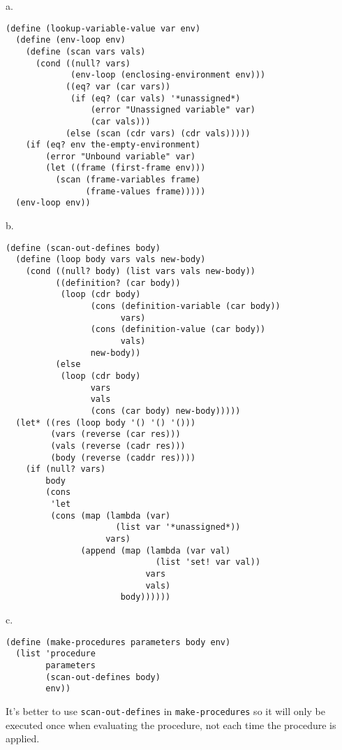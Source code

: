 \documentclass[a4paper,12pt]{article}
\newcommand{\subpar}[1]{\medskip \noindent #1.}
\begin{document}
\subpar{a}
\begin{lstlisting}
(define (lookup-variable-value var env)
  (define (env-loop env)
    (define (scan vars vals)
      (cond ((null? vars)
             (env-loop (enclosing-environment env)))
            ((eq? var (car vars))
             (if (eq? (car vals) '*unassigned*)
                 (error "Unassigned variable" var)
                 (car vals)))
            (else (scan (cdr vars) (cdr vals)))))
    (if (eq? env the-empty-environment)
        (error "Unbound variable" var)
        (let ((frame (first-frame env)))
          (scan (frame-variables frame)
                (frame-values frame)))))
  (env-loop env))
\end{lstlisting}

\subpar{b}
\begin{lstlisting}
(define (scan-out-defines body)
  (define (loop body vars vals new-body)
    (cond ((null? body) (list vars vals new-body))
          ((definition? (car body))
           (loop (cdr body)
                 (cons (definition-variable (car body))
                       vars)
                 (cons (definition-value (car body))
                       vals)
                 new-body))
          (else
           (loop (cdr body)
                 vars
                 vals
                 (cons (car body) new-body)))))
  (let* ((res (loop body '() '() '()))
         (vars (reverse (car res)))
         (vals (reverse (cadr res)))
         (body (reverse (caddr res))))
    (if (null? vars)
        body
        (cons
         'let
         (cons (map (lambda (var)
                      (list var '*unassigned*))
                    vars)
               (append (map (lambda (var val)
                              (list 'set! var val))
                            vars
                            vals)
                       body))))))
\end{lstlisting}

\subpar{c}

\begin{lstlisting}
(define (make-procedures parameters body env)
  (list 'procedure
        parameters
        (scan-out-defines body)
        env))
\end{lstlisting}

It's better to use \lstinline!scan-out-defines! in
\lstinline!make-procedures! so it will only be executed once when
evaluating the procedure, not each time the procedure is applied.
\end{document}
